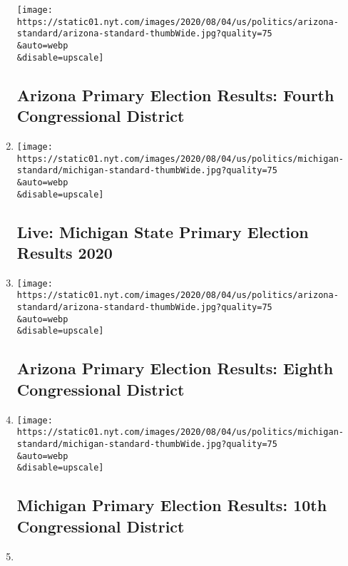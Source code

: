\begin{enumerate}
  \texttt{[image: https://static01.nyt.com/images/2020/08/04/us/politics/arizona-standard/arizona-standard-thumbWide.jpg?quality=75\\\&auto=webp\\\&disable=upscale]}

  \hypertarget{arizona-primary-election-results-fourth-congressional-district}{%
  \subsection{Arizona Primary Election Results: Fourth Congressional
  District}\label{arizona-primary-election-results-fourth-congressional-district}}
\item
  \href{/interactive/2020/08/04/us/elections/results-michigan-primary-elections.html}{}

  \texttt{[image: https://static01.nyt.com/images/2020/08/04/us/politics/michigan-standard/michigan-standard-thumbWide.jpg?quality=75\\\&auto=webp\\\&disable=upscale]}

  \hypertarget{live-michigan-state-primary-election-results-2020}{%
  \subsection{Live: Michigan State Primary Election Results
  2020}\label{live-michigan-state-primary-election-results-2020}}
\item
  \href{/interactive/2020/08/04/us/elections/results-arizona-house-district-8-primary-election.html}{}

  \texttt{[image: https://static01.nyt.com/images/2020/08/04/us/politics/arizona-standard/arizona-standard-thumbWide.jpg?quality=75\\\&auto=webp\\\&disable=upscale]}

  \hypertarget{arizona-primary-election-results-eighth-congressional-district}{%
  \subsection{Arizona Primary Election Results: Eighth Congressional
  District}\label{arizona-primary-election-results-eighth-congressional-district}}
\item
  \href{/interactive/2020/08/04/us/elections/results-michigan-house-district-10-primary-election.html}{}

  \texttt{[image: https://static01.nyt.com/images/2020/08/04/us/politics/michigan-standard/michigan-standard-thumbWide.jpg?quality=75\\\&auto=webp\\\&disable=upscale]}

  \hypertarget{michigan-primary-election-results-10th-congressional-district}{%
  \subsection{Michigan Primary Election Results: 10th Congressional
  District}\label{michigan-primary-election-results-10th-congressional-district}}
\item
  \href{/interactive/2020/08/04/us/elections/results-michigan-house-district-13-primary-election.html}{}


\end{enumerate}
